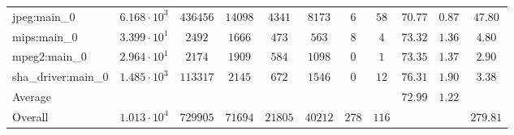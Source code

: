 \begin{tabular}{|l|c|c|c|c|c|c|c|c|c|c|}
jpeg:main\_0            & $ 6.168 \cdot 10^{3} $ & $ 436456 $ & $ 14098 $ & $ 4341  $ & $ 8173  $ & $ 6   $ & $ 58  $ & $ 70.77       $ & $ 0.87    $ & $ 47.80   $ \\
mips:main\_0            & $ 3.399 \cdot 10^{1} $ & $ 2492   $ & $ 1666  $ & $ 473   $ & $ 563   $ & $ 8   $ & $ 4   $ & $ 73.32       $ & $ 1.36    $ & $ 4.80    $ \\
mpeg2:main\_0           & $ 2.964 \cdot 10^{1} $ & $ 2174   $ & $ 1909  $ & $ 584   $ & $ 1098  $ & $ 0   $ & $ 1   $ & $ 73.35       $ & $ 1.37    $ & $ 2.90    $ \\
sha\_driver:main\_0     & $ 1.485 \cdot 10^{3} $ & $ 113317 $ & $ 2145  $ & $ 672   $ & $ 1546  $ & $ 0   $ & $ 12  $ & $ 76.31       $ & $ 1.90    $ & $ 3.38    $ \\
\hline
Average                 & $                    $ & $        $ & $       $ & $       $ & $       $ & $     $ & $     $ & $ 72.99       $ & $ 1.22    $ & $         $ \\
\hline
Overall                 & $ 1.013 \cdot 10^{4} $ & $ 729905 $ & $ 71694 $ & $ 21805 $ & $ 40212 $ & $ 278 $ & $ 116 $ & $             $ & $         $ & $ 279.81  $ \\
\hline
\end{tabular}
